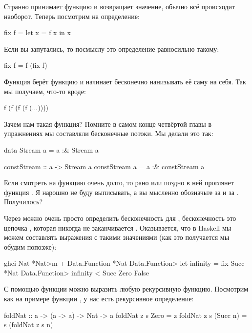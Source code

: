 Странно  принимает функцию и возвращает значение,
обычно всё происходит наоборот. Теперь посмотрим на определение:

\begin{code}
fix f = let x = f x
        in  x
\end{code}

Если вы запутались, то посмыслу это определение равносильно такому:

\begin{code}
fix f = f (fix f)
\end{code}

Функция  берёт функцию и начинает бесконечно нанизывать
её саму на себя. Так мы получаем, что-то вроде:

\begin{code}
f (f (f (f (...))))
\end{code}

Зачем нам такая функция? Помните в самом конце четвёртой главы
в упражнениях мы составляли бесконечные потоки. Мы делали это так:

\begin{code}
data Stream a = a :& Stream a

constStream :: a -> Stream a
constStream a = a :& constStream a
\end{code}

Если смотреть на функцию  очень долго,
то рано или поздно в ней проглянет функция . 
Я нарошно не буду выписывать, а вы мысленно обозначьте 
 за  и  за .
Получилось?

Через  можно очень просто определить 
бесконечность для , бесконечность это
цепочка , которая никогда не заканчивается .
Оказывается, что в Haskell мы можем составлять выражения 
с такими значениями (как это получается мы обудим попозже):

\begin{code}
ghci Nat
*Nat>m + Data.Function
*Nat Data.Function> let infinity = fix Succ
*Nat Data.Function> infinity < Succ Zero
False
\end{code}

С помощью функции  можно выразить любую рекурсивную
функцию. Посмотрим как на примере функции ,
у нас есть рекурсивное определение:

\begin{code}
foldNat :: a -> (a -> a) -> Nat -> a
foldNat z  s  Zero      = z
foldNat z  s  (Succ n)  = s (foldNat z s n)
\end{code}

